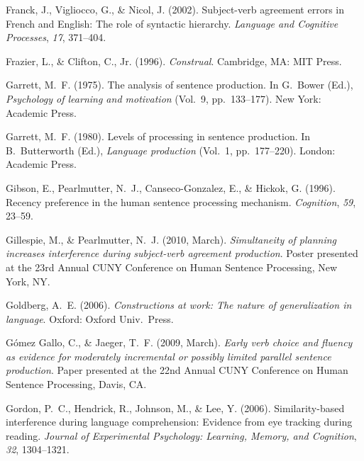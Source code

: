 \documentclass[12pt,titlepage]{article}
\newcommand{\itt}{\textit}  %
\begin{document}
\begin{description}
    \item Franck, J., Vigliocco, G., \& Nicol, J\@.  (2002).  Subject-verb
    agreement errors in French and English: The role of syntactic
    hierarchy.  \itt{Language and Cognitive Processes}, \itt{17}, 371--404.
    
    \item Frazier, L., \& Clifton, C., Jr.  (1996).  \itt{Construal}.
    Cambridge, MA: MIT Press.
    
    \item Garrett, M.~F\@.  (1975).  The analysis of sentence production.
    In G.~Bower (Ed.), \itt{Psychology of learning and motivation} (Vol.~9,
    pp.~133--177).  New York: Academic Press.
    
    \item Garrett, M.~F\@.  (1980).  Levels of processing in sentence
    production.  In B.~Butterworth (Ed.), \itt{Language production}
    (Vol.~1, pp.~177--220).  London: Academic Press.
    
    \item Gibson, E., Pearlmutter, N.~J., Canseco-Gonzalez, E., \& Hickok,
    G\@.  (1996).  Recency preference in the human sentence processing
    mechanism.  \itt{Cognition}, \itt{59}, 23--59.
    
    \item Gillespie, M., \& Pearlmutter, N.~J\@.  (2010, March).
    \itt{Simultaneity of planning increases interference during
    subject-verb agreement production}.  Poster presented at the 23rd
    Annual CUNY Conference on Human Sentence Processing, New York, NY.
    
    \item Goldberg, A.~E\@.  (2006).  \itt{Constructions at work: The
    nature of generalization in language}.  Oxford: Oxford Univ.\ Press.
    
    \item G\'{o}mez Gallo, C., \& Jaeger, T.~F\@.  (2009, March).
    \itt{Early verb choice and fluency as evidence for moderately
    incremental or possibly limited parallel sentence production}.  Paper
    presented at the 22nd Annual CUNY Conference on Human Sentence
    Processing, Davis, CA.
    
    \item Gordon, P.~C., Hendrick, R., Johnson, M., \& Lee, Y\@.  (2006).
    Similarity-based interference during language comprehension: Evidence
    from eye tracking during reading.  \itt{Journal of Experimental
    Psychology: Learning, Memory, and Cognition}, \itt{32}, 1304--1321.
    

\end{description}
\end{document}
